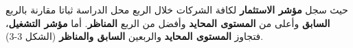حيث سجل \textbf{مؤشر الاستثمار} لكافة الشركات خلال الربع محل الدراسة ثباتا مقارنة بالربع \textbf{السابق} وأعلى من \textbf{المستوى المحايد} وأفضل من الربع \textbf{المناظر}. أما \textbf{مؤشر التشغيل}، فتجاوز \textbf{المستوى المحايد} والربعين \textbf{السابق والمناظر} (الشكل 3-3).
